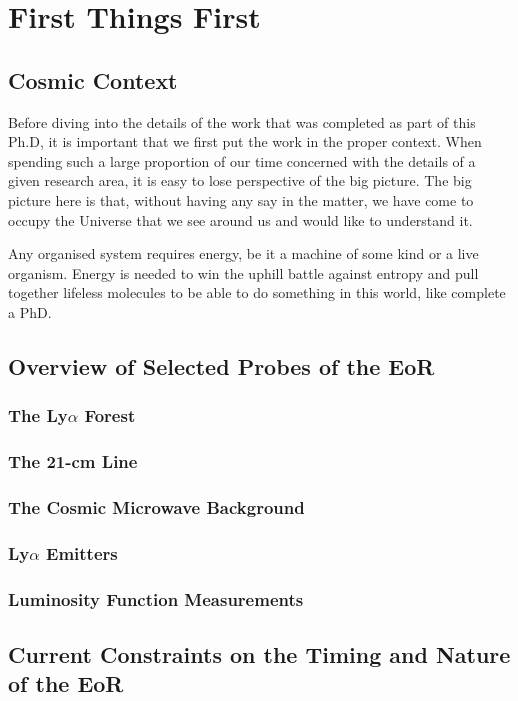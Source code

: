 


\ifpdf
    \graphicspath{{introduction/figures/PNG/}{introduction/figures/PDF/}{introduction/figures/}}
\else
    \graphicspath{{introduction/figures/EPS/}{introduction/figures/}}
\fi

\chapter{First Things First}
\section{Cosmic Context}
Before diving into the details of the work that was completed as part of this Ph.D, it is important that we first put the work in the proper context. When spending such a large proportion of our time concerned with the details of a given research area, it is easy to lose perspective of the big picture. The big picture here is that, without having any say in the matter, we have come to occupy the Universe that we see around us and would like to understand it. 

Any organised system requires energy, be it a machine of some kind or a live organism. Energy is needed to win the uphill battle against entropy and pull together lifeless molecules to be able to do something in this world, like complete a PhD.

\section{Overview of Selected Probes of the EoR}
\subsection{The Ly$\alpha$ Forest}
\subsection{The 21-cm Line}
\subsection{The Cosmic Microwave Background}
\subsection{Ly$\alpha$ Emitters}
\subsection{Luminosity Function Measurements}

\section{Current Constraints on the Timing and Nature of the EoR}





